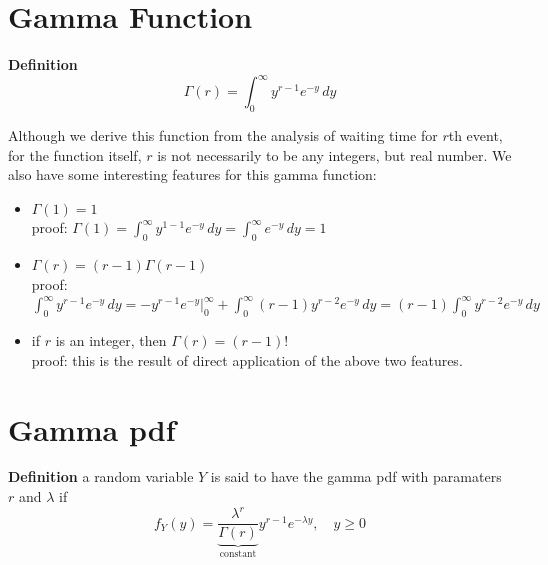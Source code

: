 \documentclass[11pt]{article}
\begin{document}
\section{\normalsize Gamma Function}


\begin{tcolorbox}[
	enhanced, 
	width=\textwidth, 
	fontupper=\normalsize,%
	drop fuzzy shadow southwest,
	boxrule=0.4pt,
	sharp corners,
	colframe=yellow!80!black,
	colback=yellow!10]
	
\textbf{\color{RoyalBlue} Definition}  
\[ 
\Gamma (r) = \int _0 ^\infty y^{r-1} e^{-y} \, dy
\]

\end{tcolorbox}

Although we derive this function from the analysis of waiting time for $r$th event,  for the function itself,  $r$ is not necessarily to be any integers,  but real number.  We also have some interesting features for this gamma function:
\begin{itemize}
\item $\Gamma (1) = 1$ \\
proof: $\displaystyle \Gamma (1) = \int _0 ^\infty y^{1-1}e^{-y} \, dy = \int _0 ^  \infty e^{-y} \, dy = 1 $
\item $ \Gamma (r) = (r-1) \Gamma(r-1) $ \\
proof:  $\displaystyle \int _0 ^\infty y^{r-1} e^{-y} \, dy = -y^{r-1} e^{-y} \bigg | ^\infty _0  + \int _0 ^\infty (r-1) y^{r-2} e^{-y} \, dy = (r-1) \int _0 ^\infty y^{r-2} e^{-y} \, dy   $
\item if $r$ is an integer, then $\Gamma (r) = (r-1)!$ \\
proof: this is the result of direct application of the above two features.
\end{itemize}



\section{\normalsize Gamma pdf}


\begin{tcolorbox}[
	enhanced, 
	width=\textwidth, 
	fontupper=\normalsize,%
	drop fuzzy shadow southwest,
	boxrule=0.4pt,
	sharp corners,
	colframe=yellow!80!black,
	colback=yellow!10]
	
\textbf{\color{RoyalBlue} Definition}  \quad a random variable $Y$ is said to have the gamma pdf with paramaters $r$ and $\lambda$ if
\[ 
f_Y(y) =\underbrace{ \frac{\lambda ^r}{\Gamma (r)} }_{\text {constant} } y^{r-1} e^{-\lambda y},  \quad y \geqslant 0
\]

\end{tcolorbox}
\end{document}

